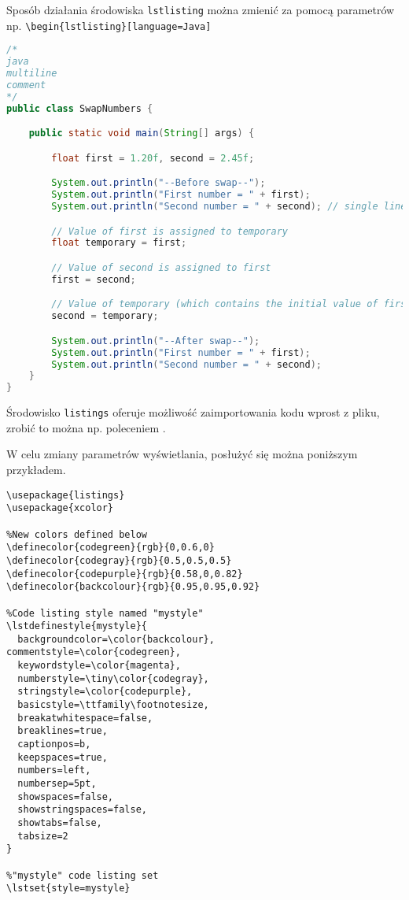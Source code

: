 Sposób działania środowiska \texttt{lstlisting} można zmienić za pomocą parametrów np. \verb|\begin{lstlisting}[language=Java]|

\begin{lstlisting}[language=Java]
/*
java
multiline
comment
*/
public class SwapNumbers {

    public static void main(String[] args) {

        float first = 1.20f, second = 2.45f;

        System.out.println("--Before swap--");
        System.out.println("First number = " + first);
        System.out.println("Second number = " + second); // single line comment

        // Value of first is assigned to temporary
        float temporary = first;

        // Value of second is assigned to first
        first = second;

        // Value of temporary (which contains the initial value of first) is assigned to second. This is supposed to be very long comment or line of the code to show that it can be wrapped by the LaTeX.
        second = temporary;

        System.out.println("--After swap--");
        System.out.println("First number = " + first);
        System.out.println("Second number = " + second);
    }
}
\end{lstlisting}

Środowisko \texttt{listings} oferuje możliwość zaimportowania kodu wprost z pliku, zrobić to można np. poleceniem \verb||.



W celu zmiany parametrów wyświetlania, posłużyć się można poniższym przykładem.

\begin{lstlisting}
\usepackage{listings}
\usepackage{xcolor}

%New colors defined below
\definecolor{codegreen}{rgb}{0,0.6,0}
\definecolor{codegray}{rgb}{0.5,0.5,0.5}
\definecolor{codepurple}{rgb}{0.58,0,0.82}
\definecolor{backcolour}{rgb}{0.95,0.95,0.92}

%Code listing style named "mystyle"
\lstdefinestyle{mystyle}{
  backgroundcolor=\color{backcolour},   commentstyle=\color{codegreen},
  keywordstyle=\color{magenta},
  numberstyle=\tiny\color{codegray},
  stringstyle=\color{codepurple},
  basicstyle=\ttfamily\footnotesize,
  breakatwhitespace=false,         
  breaklines=true,                 
  captionpos=b,                    
  keepspaces=true,                 
  numbers=left,                    
  numbersep=5pt,                  
  showspaces=false,                
  showstringspaces=false,
  showtabs=false,                  
  tabsize=2
}

%"mystyle" code listing set
\lstset{style=mystyle}
\end{lstlisting}

